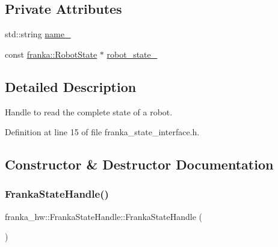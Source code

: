 \subsection*{Private Attributes}
\begin{DoxyCompactItemize}
\item 
std\+::string \hyperlink{classfranka__hw_1_1FrankaStateHandle_a15abdf997d8480501d66250dab2fc6c8}{name\+\_\+}
\item 
const \hyperlink{structfranka_1_1RobotState}{franka\+::\+Robot\+State} $\ast$ \hyperlink{classfranka__hw_1_1FrankaStateHandle_ab4c6a16f32cb305e08d9f2a4514b2a77}{robot\+\_\+state\+\_\+}
\end{DoxyCompactItemize}


\subsection{Detailed Description}
Handle to read the complete state of a robot. 

Definition at line 15 of file franka\+\_\+state\+\_\+interface.\+h.



\subsection{Constructor \& Destructor Documentation}
\mbox{\label{classfranka__hw_1_1FrankaStateHandle_a53fa76e902a8181d42795379369c8044}} 
\subsubsection{\texorpdfstring{Franka\+State\+Handle()}{FrankaStateHandle()}\hspace{0.1cm}{\footnotesize\ttfamily [1/2]}}
{\footnotesize\ttfamily franka\+\_\+hw\+::\+Franka\+State\+Handle\+::\+Franka\+State\+Handle (\begin{DoxyParamCaption}{ }\end{DoxyParamCaption})\hspace{0.3cm}{\ttfamily [delete]}}

\mbox{\label{classfranka__hw_1_1FrankaStateHandle_aa1e678a0ad409591d0ee19b9e45f19c6}} 
